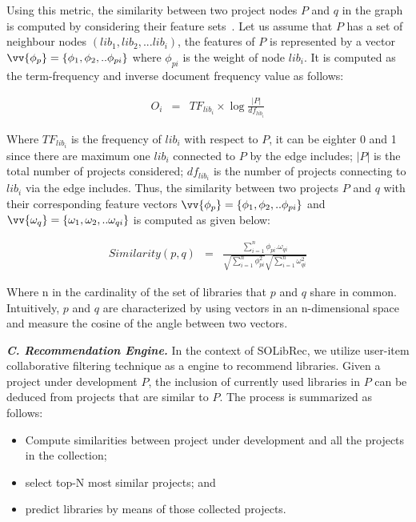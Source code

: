 \documentclass[paper]{ieice}
\begin{document}
Using this metric, the similarity between two project nodes $P$ and $q$ in the graph is computed by considering their feature sets~\cite{di2012linked}. Let us assume that $P$ has a set of neighbour nodes $( lib_1, lib_2, ...lib_i)$, the features of $P$ is represented by a vector $\vv{\phi_{p}}= \{ \phi_1, \phi_2, ..\phi_{pi}\}$ where $\phi_{pi}$ is the weight of node $lib_i$. It is computed as the term-frequency and inverse document frequency value as follows: 

\begin{eqnarray}
    O_i & = & TF_{lib_i}\times \log\frac{|P|}{df_{lib_i}}
\end{eqnarray}


Where $TF_{lib_i}$ is the frequency of $lib_i$ with respect to $P$, it can be eighter 0 and 1 since there are maximum one $lib_i$ connected to $P$ by the edge includes; $|P|$ is the total number of projects considered; $df_{lib_i}$ is the number of projects connecting to $lib_i$ via the edge includes. Thus, the similarity between two projects $P$ and $q$ with their corresponding feature vectors $\vv{\phi_p}= \{ \phi_1, \phi_2, ..\phi_{pi}\}$ and $\vv{\omega_{q}}= \{ \omega_1, \omega_2, ..\omega_{qi}\}$ is computed as given below:

\begin{eqnarray}
    Similarity (p,q) & = & \frac{\sum_{i=1}^{n} \phi_{pi}.\omega_{qi}}{\sqrt{\sum_{i=1}^{n} \phi_{pi}^2} \sqrt{\sum_{i=1}^{n} \omega_{qi}^2}}
\end{eqnarray}


Where n in the cardinality of the set of libraries that $p$ and $q$ share in common. Intuitively, $p$ and $q$ are characterized by using vectors in an n-dimensional space and measure the cosine of the angle between two vectors.


\textit{\textbf{C. Recommendation Engine.}}
 In the context of SOLibRec, we utilize user-item collaborative filtering technique as a engine to recommend libraries. Given a project under development $P$, the inclusion of currently used libraries in $P$ can be deduced from projects that are similar to $P$. The process is summarized as follows:
\begin{itemize}
    \item Compute similarities between project under development and all the projects in the collection;
    \item select top-N most similar projects; and
    \item predict libraries by means of those collected projects.
\end{itemize}
\end{document}
